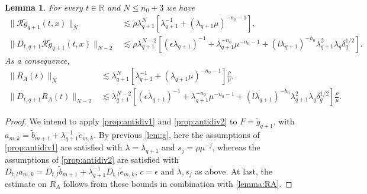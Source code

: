 \documentclass[10pt,a4paper]{amsart}
\numberwithin{equation}{section}
\numberwithin{corollario}{section}
\newtheorem{lemma}{Lemma}
\numberwithin{lemma}{section}
\numberwithin{prop}{section}
\theoremstyle{definition}
\theoremstyle{remark}
\newcommand{\R}{\mathbb{R}}
\newcommand{\qq}{_{q+1}}
\begin{document}
\begin{lemma}\label{lemma:gtilde}
   For every $t \in \R$ and $N \leq n_0+3$ we have
    \begin{align}
        \| \mathcal{R}\tilde{g}\qq(t,x) \|_{N}
        &\lesssim 
        \rho \lambda\qq^{N} [\lambda\qq^{-1} + (\lambda\qq \mu)^{-n_0-1}],
        \\
        \| D_{t,q+1} \mathcal{R}\tilde{g}\qq(t,x) \|_{N-2}
        &\lesssim
        \rho \lambda\qq^{N-2}\left[(\epsilon\lambda\qq)^{-1}+\lambda\qq^{-n_0}\mu^{-n_0-1}+(l\lambda\qq)^{-h_0}\lambda\qq^2\lambda_q\delta_q^{1/2}\right].
    \end{align}
    As a consequence,
    \begin{align}
    \|R_A(t)\|_N
    &\lesssim \lambda\qq^N\left[\lambda\qq^{-1}+(\lambda\qq\mu)^{-n_0-1}\right]\frac{\rho}{\mu},\\
    \|D_{t,q+1}R_A(t)\|_{N-2}
    &\lesssim \lambda\qq^{N-2}\left[(\epsilon\lambda\qq)^{-1}+\lambda\qq^{-n_0}\mu^{-n_0-1}+(l\lambda\qq)^{-h_0}\lambda\qq^2\lambda_q\delta_q^{1/2}\right]\frac{\rho}{\mu}.
    \end{align}
\end{lemma}
\begin{proof}
We intend to apply \autoref{prop:antidiv1} and \autoref{prop:antidiv2} to $F=\tilde{g}\qq$, with $a_{m,k}= \tilde{b}_{m+1} + \lambda\qq^{-1} \tilde{e}_{m,k}$. By previous \autoref{lem:g}, here the assumptions of \autoref{prop:antidiv1} are satisfied with $\lambda=\lambda\qq$ and $s_j = \rho \mu^{-j}$, whereas the assumptions of \autoref{prop:antidiv2} are satisfied with $D_{t,l}a_{m,k}= D_{t,l}\tilde{b}_{m+1} + \lambda\qq^{-1}D_{t,l}\tilde{e}_{m,k}$, $c=\epsilon$ and $\lambda,s_j$ as above.
At last, the estimate on $R_A$ follows from these bounds in combination with \autoref{lemma:RA}.
\end{proof}
\end{document}
